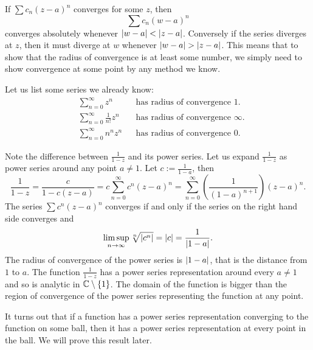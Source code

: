 If $\sum c_n {(z-a)}^n$ converges for some $z$, then
\begin{equation*}
\sum c_n {(w-a)}^n
\end{equation*}
converges absolutely whenever $\lvert {w-a} \rvert < \lvert {z-a} \rvert$.
Conversely if the series diverges at $z$, then it must diverge at $w$
whenever $\lvert {w-a} \rvert > \lvert {z-a} \rvert$.
This means that to show
that the radius of convergence is at least some number, we simply need to
show convergence at some point by any method we know.

\begin{example}
Let us list some series we already know:
\begin{align*}
& &
& \sum_{n=0}^\infty z^n
& & \text{has radius of convergence $1$.}
& &
\\
& &
& \sum_{n=0}^\infty \frac{1}{n!} z^n
& & \text{has radius of convergence $\infty$.}
& &
\\
& &
& \sum_{n=0}^\infty n^n z^n
& & \text{has radius of convergence $0$.}
& &
\end{align*}
\end{example}

\begin{example}
Note the difference between $\frac{1}{1-z}$ and its power series.  Let us
expand $\frac{1}{1-z}$ as power series around any point $a \not= 1$.
Let $c := \frac{1}{1-a}$, then
\begin{equation*}
\frac{1}{1-z} = 
\frac{c}{1-c(z-a)}
=
c
\sum_{n=0}^\infty c^{n} {(z-a)}^n
=
\sum_{n=0}^\infty \left( \frac{1}{{(1-a)}^{n+1}} \right) {(z-a)}^n .
\end{equation*}
The series $\sum c^n {(z-a)}^n$ converges if and only if 
the series on the right hand side converges and
\begin{equation*}
\limsup_{n\to\infty}
\sqrt[n]{\lvert {c^n} \rvert} = \lvert {c} \rvert
= \frac{1}{\lvert {1-a} \rvert} .
\end{equation*}
The radius of convergence of the power series is $\lvert {1-a} \rvert$, that is the
distance from $1$ to $a$.  The function $\frac{1}{1-z}$
has a power series
representation around every $a\not= 1$ and so is analytic in ${\mathbb{C}} \setminus
\{ 1 \}$.
The domain of the function is bigger than the region
of convergence of the power series representing the function at any point.
\end{example}

It turns out that 
if a function has a power series representation converging to the function
on some ball,
then it has a power series representation at every point in the ball.  We will prove this
result later.

